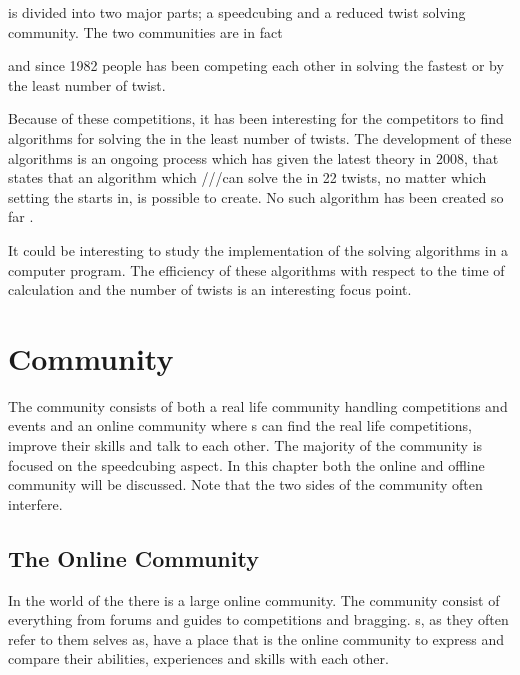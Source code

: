 


 
is divided into two major parts; a speedcubing and a reduced twist solving community. The two communities are in fact  


 and since 1982 people has been competing each other in solving the \rubik{} fastest or by the least number of twist. 


Because of these competitions, it has been interesting for the competitors to find algorithms for solving the \rubik{} in the least number of twists. The development of these algorithms is an ongoing process which has given the latest theory in 2008, that states that an algorithm which ///can solve the \rubik{} in 22 twists, no matter which setting the \rubik{} starts in, is possible to create. No such algorithm has been created so far \cite{rokicki09}.

It could be interesting to study the implementation of the solving algorithms in a computer program. The efficiency of these algorithms with respect to the time of calculation and the number of twists is an interesting focus point.


\chapter{Community}

The \rubik{} community consists of both a real life community handling competitions and events and an online community where \cuber{}s can find the real life competitions, improve their skills and talk to each other. The majority of the community is focused on the speedcubing aspect. In this chapter both the online and offline community will be discussed. Note that the two sides of the community often interfere.

\section{The Online Community}
In the world of the \rubik{} there is a large online community. The community consist of everything from forums and guides to competitions and bragging. s, as they often refer to them selves as, have a place that is the online community to express and compare their abilities, experiences and skills with each other. 
